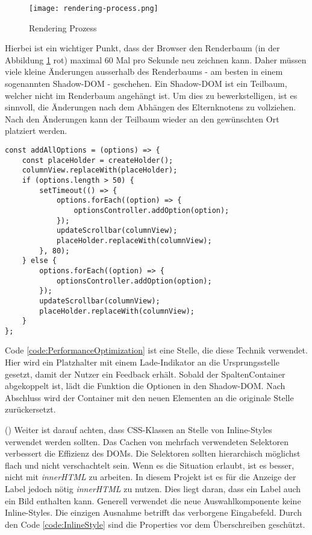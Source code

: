 \begin{figure}[!htb]
    \centering
    \texttt{[image: rendering-process.png]}
    \caption{Rendering Prozess}
    \label{img:RenderingProcessRecap}
\end{figure}

Hierbei ist ein wichtiger Punkt, dass der Browser den Renderbaum (in der Abbildung \ref{img:RenderingProcessRecap} rot) maximal 60 Mal pro Sekunde neu zeichnen kann.
Daher müssen viele kleine Änderungen ausserhalb des Renderbaums - am besten in einem sogenannten Shadow-DOM - geschehen.
Ein Shadow-DOM ist ein Teilbaum, welcher nicht im Renderbaum angehängt ist.
Um dies zu bewerkstelligen, ist es sinnvoll, die Änderungen nach dem Abhängen des Elternknotens zu vollziehen. 
Nach den Änderungen kann der Teilbaum wieder an den gewünschten Ort platziert werden.

\begin{lstlisting}[style = htmlcssjs, caption = Performance Optimierung (columnOptionsComponent.js), label = code:PerformanceOptimization]
const addAllOptions = (options) => {
    const placeHolder = createHolder();
    columnView.replaceWith(placeHolder);
    if (options.length > 50) {
        setTimeout(() => {
            options.forEach((option) => {
                optionsController.addOption(option);
            });
            updateScrollbar(columnView);
            placeHolder.replaceWith(columnView);
        }, 80);
    } else {
        options.forEach((option) => {
            optionsController.addOption(option);
        });
        updateScrollbar(columnView);
        placeHolder.replaceWith(columnView);
    }
};
\end{lstlisting}

Code \ref{code:PerformanceOptimization} ist eine Stelle, die diese Technik verwendet.
Hier wird ein Platzhalter mit einem Lade-Indikator an die Ursprungsstelle gesetzt, damit der Nutzer ein Feedback erhält.
Sobald der SpaltenContainer abgekoppelt ist, lädt die Funktion die Optionen in den Shadow-DOM.
Nach Abschluss wird der Container mit den neuen Elementen an die originale Stelle zurückersetzt.

(\cite{efficientDomManipulation}) Weiter ist darauf achten, dass CSS-Klassen an Stelle von Inline-Styles verwendet werden sollten.
Das Cachen von mehrfach verwendeten Selektoren verbessert die Effizienz des DOMs.
Die Selektoren sollten hierarchisch möglichst flach und nicht verschachtelt sein.
Wenn es die Situation erlaubt, ist es besser, nicht mit \emph{innerHTML} zu arbeiten.
In diesem Projekt ist es für die Anzeige der Label jedoch nötig \emph{innerHTML} zu nutzen.
Dies liegt daran, dass ein Label auch ein Bild enthalten kann.
Generell verwendet die neue Auswahlkomponente keine Inline-Styles.
Die einzigen Ausnahme betrifft das verborgene Eingabefeld. 
Durch den Code \ref{code:InlineStyle} sind die Properties vor dem Überschreiben geschützt.

